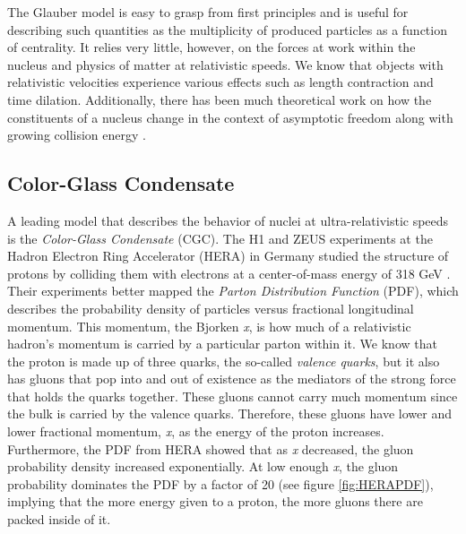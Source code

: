 The Glauber model is easy to grasp from first principles and is useful for describing such quantities as the multiplicity of produced particles as a function of centrality. It relies very little, however, on the forces at work within the nucleus and physics of matter at relativistic speeds. We know that objects with relativistic velocities experience various effects such as length contraction and time dilation. Additionally, there has been much theoretical work on how the constituents of a nucleus change in the context of asymptotic freedom along with growing collision energy \citep{PhysRevD.10.1649}.

\subsection{Color-Glass Condensate}
A leading model that describes the behavior of nuclei at ultra-relativistic speeds is the \textit{Color-Glass Condensate} (CGC). The H1 and ZEUS experiments at the Hadron Electron Ring Accelerator (HERA) in Germany studied the structure of protons by colliding them with electrons at a center-of-mass energy of 318 GeV \citep{Abramowicz2015}. Their experiments better mapped the \textit{Parton Distribution Function} (PDF), which describes the probability density of particles versus fractional longitudinal momentum. This momentum, the Bjorken \textit{x}, is how much of a relativistic hadron's momentum is carried by a particular parton within it. We know that the proton is made up of three quarks, the so-called \textit{valence quarks}, but it also has gluons that pop into and out of existence as the mediators of the strong force that holds the quarks together. These gluons cannot carry much momentum since the bulk is carried by the valence quarks. Therefore, these gluons have lower and lower fractional momentum, \textit{x}, as the energy of the proton increases. Furthermore, the PDF from HERA showed that as \textit{x} decreased, the gluon probability density increased exponentially. At low enough \textit{x}, the gluon probability dominates the PDF by a factor of 20 (see figure \ref{fig:HERAPDF}), implying that the more energy given to a proton, the more gluons there are packed inside of it.

